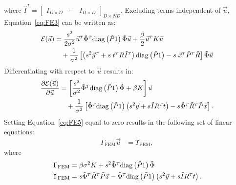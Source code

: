 \documentclass[journal]{IEEEtran}
\newcommand{\di}[2]{\frac{\partial#1}{\partial#2}}
\newcommand{\trans}[1]{#1^{\scriptscriptstyle T}}
\newcommand{\diag}{\mathrm{diag}}
\begin{document}
where $\trans{\hat{I}} = \begin{bmatrix} I_{D\times D} & \cdots & I_{D\times D} \end{bmatrix}_{D\times ND}$. Excluding terms independent of $\vec{u}$, Equation~\ref{eq:FE3} can be written as:
\begin{align}\label{eq:FE4}
    \mathcal{E}(\vec{u}) & = \dfrac{s^2}{2\sigma^2}\trans{\vec{u}}\trans{\tilde{\Phi}}\diag\left(\tilde{P}1\right)\tilde{\Phi}\vec{u} + \dfrac{\beta}{2}\trans{\vec{u}}K\vec{u}\\
    & \quad + \dfrac{1}{\sigma^2}\left[\left(s^2\trans{\vec{y}}+s\;\trans{t}R\trans{\tilde{I}}\right)
        \diag\left(\tilde{P}1\right)-s\;\trans{\vec{x}}\trans{\tilde{P}}\tilde{R}\right]\tilde{\Phi}\vec{u}\notag
\end{align}
Differentiating with respect to $\vec{u}$ results in:
\begin{align}\label{eq:FE5}
    \di{\mathcal{E}(\vec{u})}{\vec{u}} & = \left[\dfrac{s^2}{\sigma^2}\trans{\tilde{\Phi}}\diag\left(\tilde{P}1\right)\tilde{\Phi} + \beta K\right]\vec{u}\\
        & \quad + \dfrac{1}{\sigma^2}\left[\trans{\tilde{\Phi}}\diag\left(\tilde{P}1\right)\left(s^2\vec{y}+s\tilde{I}\trans{R}t\right)
        -s\trans{\tilde{\Phi}}\trans{\tilde{R}}\tilde{P}\vec{x}\right].\notag
\end{align}
Setting Equation~\ref{eq:FE5} equal to zero results in the following set of linear equations:
\begin{align}\label{eq:FE6}
    \Gamma_\mathrm{FEM}\vec{u} &= \Upsilon_\mathrm{FEM},
\end{align}
where
\begin{align}\label{eq:FE7}
\Gamma_\mathrm{FEM} &= \beta \sigma^2K + s^2\trans{\tilde{\Phi}}\diag\left(\tilde{P}1\right)\tilde{\Phi}\\
    \Upsilon_\mathrm{FEM} &= s\trans{\tilde{\Phi}}\trans{\tilde{R}}\tilde{P}\vec{x} - \trans{\tilde{\Phi}}\diag\left(\tilde{P}1\right)\left(s^2\vec{y}+s\tilde{I}\trans{R}t\right).\notag
\end{align}
\end{document}
